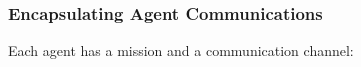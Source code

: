 \documentclass{beamer}
\begin{document}
\begin{frame}
  \frametitle{Encapsulating Agent Communications}

  Each agent has a mission and a communication channel:


\end{frame}
\end{document}
